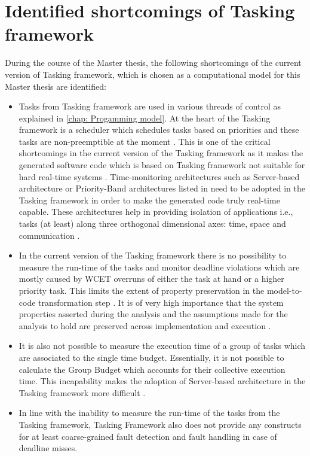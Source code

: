 \section{Identified shortcomings of Tasking framework}
\label{section: Identififed shortcomings}
During the course of the Master thesis, the following shortcomings of the current version of Tasking framework, which is chosen as a computational model for this Master thesis are identified:
\begin{itemize}
\item Tasks from Tasking framework are used in various threads of control as explained in \cref{chap: Progamming model}. At the heart of the Tasking framework is a scheduler which schedules tasks based on priorities and these tasks are non-preemptible at the moment \cite{TaskFr}. This is one of the critical shortcomings in the current version of the Tasking framework as it makes the generated software code which is based on Tasking framework not suitable for hard real-time systems \cite{TempIsolation}. Time-monitoring architectures such as Server-based architecture or Priority-Band architectures listed in \cite{TempIsolation} need to be adopted in the Tasking framework in order to make the generated code truly real-time capable. These architectures help in providing isolation of applications i.e., tasks (at least) along three orthogonal dimensional axes: time, space and communication \cite{TempIsolation}.
\item In the current version of the Tasking framework there is no possibility to measure the run-time of the tasks and monitor deadline violations which are mostly caused by WCET overruns of either the task at hand or a higher priority task. This limits the extent of property preservation in the model-to-code transformation step \cite{TempIsolation}. It is of very high importance that the system properties asserted during the analysis and the assumptions made for the analysis to hold are preserved across implementation and execution \cite{EvoRAVCodeAr}\cite{TempIsolation}.
\item It is also not possible to measure the execution time of a group of tasks which are associated to the single time budget. Essentially, it is not possible to calculate the Group Budget which accounts for their collective execution time. This incapability makes the adoption of Server-based architecture in the Tasking framework more difficult \cite{TempIsolation}.
\item In line with the inability to measure the run-time of the tasks from the Tasking framework, Tasking Framework also does not provide any constructs for at least coarse-grained fault detection and fault handling in case of deadline misses. 
\end{itemize}

